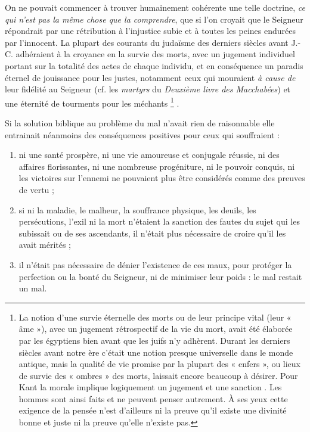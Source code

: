  On ne pouvait commencer à trouver humainement cohérente une telle doctrine, \emph{ce qui n'est pas la même chose que la comprendre}, que si l'on croyait que le Seigneur répondrait par une rétribution  à l'injustice subie et à toutes les peines endurées par l'innocent. La plupart des courants du judaïsme des derniers siècles avant J.-C. adhéraient à la croyance en la survie des morts, avec un jugement individuel portant sur la totalité des actes de chaque individu, et en conséquence un paradis éternel de jouissance pour les justes, notamment ceux qui mouraient \emph{à cause de} leur fidélité au Seigneur (cf. les \emph{martyrs} du \emph{Deuxième livre des Macchabées}) et une éternité de tourments pour les méchants%
\footnote{La notion d'une survie éternelle des morts ou de leur principe vital (leur « âme »), avec un jugement rétrospectif de la vie du mort, avait été élaborée par les égyptiens bien avant que les juifs n'y adhèrent. Durant les derniers siècles avant notre ère c'était une notion presque universelle dans le monde antique, mais la qualité de vie promise par la plupart des « enfers », ou lieux de survie des « ombres » des morts, laissait encore beaucoup à désirer. Pour Kant la morale implique logiquement un jugement et une sanction . Les hommes sont ainsi faits et ne peuvent penser autrement. À ses yeux cette exigence de la pensée n'est d'ailleurs ni la preuve qu'il existe une divinité bonne et juste ni la preuve qu'elle n'existe pas.}%
.

 Si la solution biblique au problème du mal n'avait rien de raisonnable elle entrainait néanmoins des conséquences positives pour ceux qui souffraient :
\begin{enumerate}
\item ni une santé prospère, ni une vie amoureuse et conjugale réussie, ni des affaires florissantes, ni une nombreuse progéniture, ni le pouvoir conquis, ni les victoires sur l'ennemi ne pouvaient plus être considérés comme des preuves de vertu ;
\item si ni la maladie, le malheur, la souffrance physique, les deuils, les persécutions, l'exil ni la mort n'étaient la sanction des fautes du sujet qui les subissait ou de ses ascendants, il n'était plus nécessaire de croire qu'il les avait mérités ;
\item il n'était pas nécessaire de dénier l'existence de ces maux, pour protéger la perfection ou la bonté du Seigneur, ni de minimiser leur poids : le mal restait un mal.
\end{enumerate}

